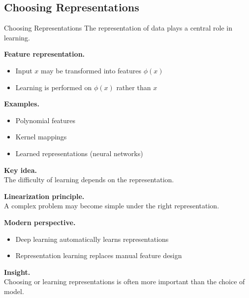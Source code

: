 \documentclass[aspectratio=169,11pt]{beamer}
\begin{document}
\subsection{Choosing Representations}
\begin{frame}[t,allowframebreaks]{Choosing Representations}
\small
The representation of data plays a central role in learning.

\textbf{Feature representation.}\\ \begin{itemize}
    \item Input $x$ may be transformed into features $\phi(x)$
    \item Learning is performed on $\phi(x)$ rather than $x$
\end{itemize}

\textbf{Examples.}\\ \begin{itemize}
    \item Polynomial features
    \item Kernel mappings
    \item Learned representations (neural networks)
\end{itemize}

\textbf{Key idea.}\\ The difficulty of learning depends on the representation.

\textbf{Linearization principle.}\\ A complex problem may become simple under the right representation.

\textbf{Modern perspective.}\\ \begin{itemize}
    \item Deep learning automatically learns representations
    \item Representation learning replaces manual feature design
\end{itemize}

\textbf{Insight.}\\ Choosing or learning representations is often more important than the choice of model.
\end{frame}
\end{document}
